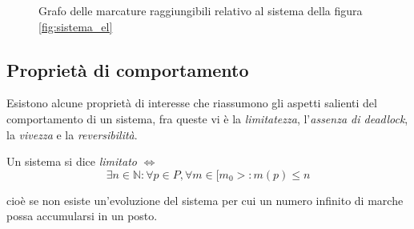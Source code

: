 \begin{figure}[H]
    \centering
    \caption{Grafo delle marcature raggiungibili relativo al sistema della figura \ref{fig:sistema_el}}
    \label{fig:grafo_casi}
\end{figure}

\subsection{Proprietà di comportamento}
Esistono alcune proprietà di interesse che riassumono gli aspetti salienti
del comportamento di un sistema, fra queste vi è la \emph{limitatezza},
l'\emph{assenza di deadlock}, la \emph{vivezza} e la \emph{reversibilità}.

\begin{definition}
\normalfont
Un sistema si dice \emph{limitato} $\iff$
$$\exists n \in \mathbb{N} : \forall p \in P, \forall m \in [m_0> : 
m(p) \leq n$$

cioè se non esiste un'evoluzione del sistema per cui un numero infinito
di marche possa accumularsi in un posto.
\end{definition}

